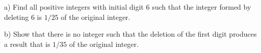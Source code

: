 a) Find all positive integers with initial digit 6 such that the integer formed by deleting 6 is $1/25$ of the original integer.

b) Show that there is no integer such that the deletion of the first digit produces a result that is $1/35$ of the original integer.
